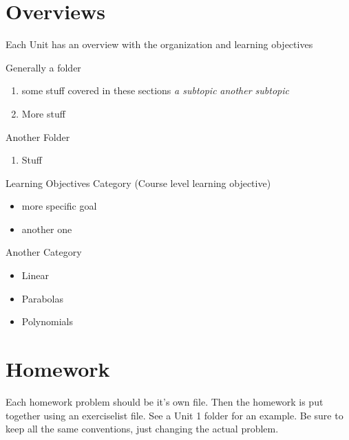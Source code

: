 \documentclass[nooutcomes]{ximera}
\begin{document}

\section{Overviews}

Each Unit has an overview with the organization and learning objectives

\begin{overview}
\item Generally a folder %
	\begin{enumerate}
	\item some stuff covered in these sections
		\textit{a subtopic} 
		\textit{another subtopic} 
	\item More stuff	
	\end{enumerate}	
\item Another Folder 
	\begin{enumerate}	
	\item Stuff 
	\end{enumerate} 
\end{overview}


\begin{objectives}
\item Learning Objectives Category (Course level learning objective)
	\begin{itemize}
	\item more specific goal
	\item another one 
	\end{itemize}
\item Another Category
	\begin{itemize}
	\item Linear 
	\item Parabolas 
	\item Polynomials 
	\end{itemize}
\end{objectives}




\newpage


\section{Homework}
Each homework problem should be it's own file.  Then the homework is put together using an exerciselist file.  See a Unit 1 folder for an example.  Be sure to keep all the same conventions, just changing the actual problem.  
\end{document}
